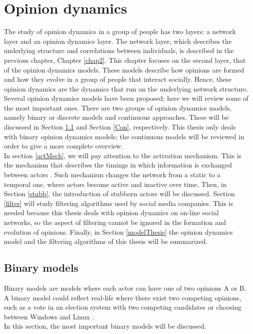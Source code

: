 \documentclass[11 pt , letterpaper , twoside , openright]{book}
\begin{document}
\chapter{Opinion dynamics}
\label{chap3}
The study of opinion dynamics in a group of people has two layers: a network layer and an opinion dynamics layer. The network layer, which describes the underlying structure and correlations between individuals, is described in the previous chapter, Chapter \ref{chap2}. This chapter focuses on the second layer, that of the opinion dynamics models. These models describe how opinions are formed and how they evolve in a group of people that interact socially. Hence, these opinion dynamics are the dynamics that run on the underlying network structure.\\
\newline
Several opinion dynamics models have been proposed; here we will review some of the most important ones. There are two groups of opinion dynamics models, namely binary or discrete models and continuous approaches. These will be discussed in Section \ref{Bin} and Section \ref{Con}, respectively. This thesis only deals with binary opinion dynamics models; the continuous models will be reviewed in order to give a more complete overview.\\
\newline
In section \ref{actMech}, we will pay attention to the activation mechanism. This is the mechanism that describes the timings in which information is exchanged between actors \cite{Perra2019}. Such mechanism changes the network from a static to a temporal one, where actors become active and inactive over time. Then, in Section \ref{stubb}, the introduction of stubborn actors will be discussed. Section \ref{filter} will study filtering algorithms used by social media companies. This is needed because this thesis deals with opinion dynamics on on-line social networks, so the aspect of filtering cannot be ignored in the formation and evolution of opinions. Finally, in Section \ref{modelThesis} the opinion dynamics model and the filtering algorithms of this thesis will be summarized.

\section{Binary models}\label{Bin}

Binary models are models where each actor can have one of two opinions A or B. A binary model could reflect real-life where there exist two competing opinions, such as a vote in an election system with two competing candidates or choosing between Windows and Linux \cite{Nguyen2020}.\\
\newline
In this section, the most important binary models will be discussed.
\end{document}
